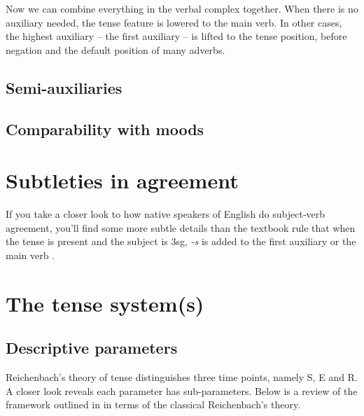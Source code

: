 \documentclass[UTF8, a4paper, oneside, scheme=plain]{ctexrep}
\newcommand*{\citesec}[1]{\S~{#1}}
\newcommand*{\citechap}[1]{Ch~{#1}}
\newcommand*{\citepages}[1]{pp.~{#1}}
\newcommand{\corpus}[1]{\emph{#1}}
\begin{document}
Now we can combine everything in the verbal complex together.
When there is no auxiliary needed,
the tense feature is lowered to the main verb. 
In other cases, the highest auxiliary -- the first auxiliary -- 
is lifted to the tense position,
before negation and the default position of many adverbs.

\subsection{Semi-auxiliaries}\label{sec:semi-auxiliary}

\subsection{Comparability with moods}\label{sec:tam-mood-compatibility}

\section{Subtleties in agreement}\label{sec:verb-inflection.agreement}

If you take a closer look to how native speakers of English do subject-verb agreement,
you'll find some more subtle details than 
the textbook rule that when the tense is \acl{present}
and the subject is 3sg, 
\corpus{-s} is added to the first auxiliary or the main verb
\citep[\citechap{5}, \citesec{18}]{cgel}.

\section{The tense system(s)}\label{sec:verb-inflection.tenses}

\subsection{Descriptive parameters}

Reichenbach's theory of tense distinguishes three time points, namely S, E and R.
A closer look reveals each parameter has sub-parameters.
Below is a review of the framework outlined in 
\citet[\citepages{125-126}]{cgel}
in terms of the classical Reichenbach's theory.
\end{document}

